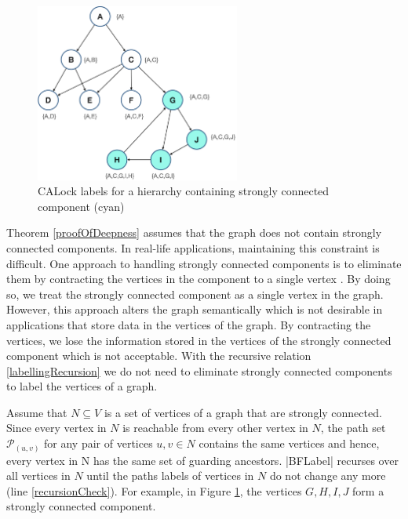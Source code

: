 \begin{figure}[H]
	\centering
	\captionsetup{justification=centering}
	\includegraphics[width=0.6\textwidth]{figures/CALock_ConnectedComponent.png}
	\caption{CALock labels for a hierarchy containing strongly connected component (cyan)}
	\label{fig:stronglyConnectedComponent}
\end{figure}

Theorem \ref{proofOfDeepness} assumes that the graph does not contain strongly connected components. 
In real-life applications, maintaining this constraint is difficult. 
One approach to handling strongly connected components is to eliminate them by contracting the vertices in the component to a single vertex \cite{sharir1981strong, tarjan1972depth, cheriyan1996algorithms,walsh2006hub}. By doing so, we treat the strongly connected component as a single vertex in the graph. 
However, this approach alters the graph semantically which is not desirable in applications that store data in the vertices of the graph. By contracting the vertices, we lose the information stored in the vertices of the strongly connected component which is not acceptable. 
With the recursive relation \ref{labellingRecursion} we do not need to eliminate strongly connected components to label the vertices of a graph. 



Assume that $N \subseteq V$ is a set of vertices of a graph that are strongly connected. Since every vertex in $N$ is reachable from every other vertex in $N$, the path set $\mathcal{P}_{(u,v)}$ for any pair of vertices $u, v\in N$ contains the same vertices and hence, every vertex in N has the same set of guarding ancestors. \inline|BFLabel| recurses over all vertices in $N$ until the paths labels of vertices in $N$ do not change any more (line \ref{recursionCheck}).
For example, in Figure \ref{fig:stronglyConnectedComponent}, the vertices $G, H, I, J$ form a strongly connected component. 

